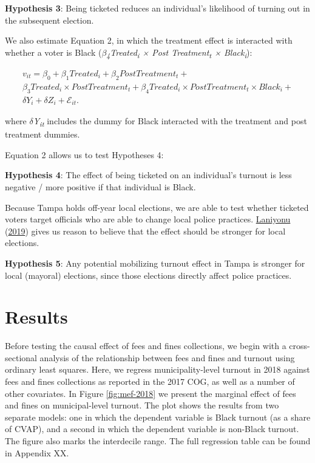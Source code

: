 \documentclass[
  12pt,
]{article}
\begin{document}
\textbf{Hypothesis 3}: Being ticketed reduces an individual's likelihood of turning out in the subsequent election.

We also estimate Equation 2, in which the treatment effect is interacted with whether a voter is Black (\emph{\(\beta\)\textsubscript{4}Treated\textsubscript{i} × Post Treatment\textsubscript{t} × Black\textsubscript{i}}):

\begin{gather}
\label{eq:2}
v_{it}=\beta_0+\beta_1Treated_{i}+\beta_2Post Treatment_{t} + \nonumber \\
\beta_3Treated_{i}\times Post Treatment_{t} + \beta_4Treated_{i}\times Post Treatment_{t}\times Black_{i} +\\
\delta{Y}_{i} + \delta{Z}_{i} + \mathcal{E}_{it}. \nonumber
\end{gather}

where \emph{\(\delta\)Y\textsubscript{it}} includes the dummy for Black interacted with the treatment and post treatment dummies.

Equation 2 allows us to test Hypotheses 4:

\textbf{Hypothesis 4}: The effect of being ticketed on an individual's turnout is less negative / more positive if that individual is Black.

Because Tampa holds off-year local elections, we are able to test whether ticketed voters target officials who are able to change local police practices. \protect\hyperlink{ref-Laniyonu2019}{Laniyonu} (\protect\hyperlink{ref-Laniyonu2019}{2019}) gives us reason to believe that the effect should be stronger for local elections.

\textbf{Hypothesis 5}: Any potential mobilizing turnout effect in Tampa is stronger for local (mayoral) elections, since those elections directly affect police practices.

\hypertarget{results}{%
\section*{Results}\label{results}}

Before testing the causal effect of fees and fines collections, we begin with a cross-sectional analysis of the relationship between fees and fines and turnout using ordinary least squares. Here, we regress municipality-level turnout in 2018 against fees and fines collections as reported in the 2017 COG, as well as a number of other covariates. In Figure \ref{fig:mef-2018} we present the marginal effect of fees and fines on municipal-level turnout. The plot shows the results from two separate models: one in which the dependent variable is Black turnout (as a share of CVAP), and a second in which the dependent variable is non-Black turnout. The figure also marks the interdecile range. The full regression table can be found in Appendix XX.
\end{document}
